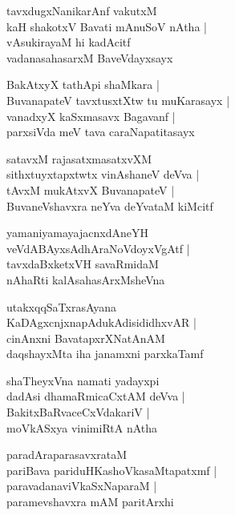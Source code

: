 \documentclass[twoside,12pt,openright]{book}
\newcounter{shloka}[chapter]
\begin{document}
\begin{shloka}
tavxdugxNanikarAnf vakutxM \\
kaH shakotxV Bavati mAnuSoV nAtha |\\
vAsukirayaM hi kadAcitf \\
vadanasahasarxM BaveVdayxsayx 
\end{shloka}

\begin{shloka}
BakAtxyX tathApi shaMkara |\\
BuvanapateV tavxtusxtXtw tu muKarasayx |\\
vanadxyX kaSxmasavx Bagavanf |\\
parxsiVda meV tava caraNapatitasayx
\end{shloka}

\begin{shloka}
satavxM rajasatxmasatxvXM \\
sithxtuyxtapxtwtx vinAshaneV deVva |\\
tAvxM mukAtxvX BuvanapateV |\\
BuvaneVshavxra neYva deYvataM kiMcitf
\end{shloka}

\begin{shloka}
yamaniyamayajacnxdAneYH \\
veVdABAyxsAdhAraNoVdoyxVgAtf |\\
tavxdaBxketxVH savaRmidaM \\
nAhaRti kalAsahasArxMsheVna
\end{shloka}

\begin{shloka}
utakxqqSaTxrasAyana \\
KaDAgxcnjxnapAdukAdisididhxvAR |\\
cinAnxni BavatapxrXNatAnAM \\
daqshayxMta iha janamxni parxkaTamf 
\end{shloka}

\begin{shloka}
shaTheyxVna namati yadayxpi \\
dadAsi dhamaRmicaCxtAM deVva |\\
BakitxBaRvaceCxVdakariV |\\
moVkASxya vinimiRtA nAtha
\end{shloka}

\begin{shloka}
paradAraparasavxrataM \\
pariBava pariduHKashoVkasaMtapatxmf |\\
paravadanaviVkaSxNaparaM |\\
paramevshavxra mAM paritArxhi 
\end{shloka}
\end{document}

